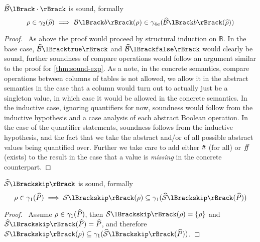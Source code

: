 \begin{conjecture}\label{thm:sound-bool}
    $\absboolsem{\cdot}$ is sound, formally
    \begin{equation*}
        \environment \in \concrete_2(\ab{\environment}) \implies \boolsem{b}(\environment) \in \concrete_{4a}(\absboolsem{b}(\ab{\environment}))
    \end{equation*}
\end{conjecture}


\begin{proof}
    \pfsketch\
    As above the proof would proceed by structural induction on $\mathbb{B}$.
    In the base case, $\absboolsem{\texttt{true}}$ and $\absboolsem{\texttt{false}}$ would clearly be sound, further soundness of compare operations would follow an argument similar to the proof for \autoref{thm:sound-exp}.
    As a note, in the concrete semantics, compare operations between columns of tables is not allowed, we allow it in the abstract semantics in the case that a column would turn out to actually just be a singleton value, in which case it would be allowed in the concrete semantics.
    In the inductive case, ignoring quantifiers for now, soundness would follow from the inductive hypothesis and a case analysis of each abstract Boolean operation.
    In the case of the quantifier statements, soundness follows from the inductive hypothesis, and the fact that we take the abstract and/or of all possible abstract values being quantified over.
    Further we take care to add either $t\!t$ (for all) or $f\!\!f$ (exists) to the result in the case that a value is \emph{missing} in the concrete counterpart.
\end{proof}


\begin{conjecture}
    \label{thm:sound-skip}
    $\abssem{\texttt{skip}}$ is sound, formally
    \begin{equation*}
    \environment \in \concrete_1(\ab{P}) \implies \sem{\texttt{skip}}(\environment) \subseteq \concrete_1(\abssem{\texttt{skip}}(\ab{P}))
    \end{equation*}
\end{conjecture}

\begin{proof}
    \pf\ Assume $\rho \in \gamma_1(\widehat{P})$, then $\sem{\texttt{skip}}(\rho) = \{\rho\}$ and $\abssem{\texttt{skip}}(\ab{P}) = \ab{P}$, and therefore $\sem{\texttt{skip}}(\rho) \subseteq \concrete_1(\abssem{\texttt{skip}}(\ab{P}))$.
\end{proof}



